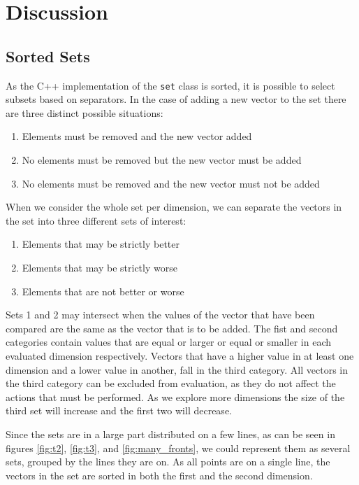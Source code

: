 \documentclass{article}
\begin{document}
	\section{Discussion}
	\label{sec:discussion}
	\subsection{Sorted Sets}
		\label{sub:sorted_sets}
		As the C++ implementation of the \texttt{set} class is sorted, it is
		possible to select subsets based on separators. In the case of adding a
		new vector to the set there are three distinct possible situations:
		\begin{enumerate}
			\item Elements must be removed and the new vector added
			\item No elements must be removed but the new vector must be added
			\item No elements must be removed and the new vector must not be added
		\end{enumerate}
		When we consider the whole set per dimension, we can separate the vectors
		in the set into three different sets of interest:
		\begin{enumerate}
			\item Elements that may be strictly better
			\item Elements that may be strictly worse
			\item Elements that are not better or worse
		\end{enumerate}
		Sets 1 and 2 may intersect when the values of the vector that have been
		compared are the same as the vector that is to be added.  The fist and
		second categories contain values that are equal or larger or equal or
		smaller in each evaluated dimension respectively.  Vectors that have a
		higher value in at least one dimension and a lower value in another, fall
		in the third category.  All vectors in the third category can be excluded
		from evaluation, as they do not affect the actions that must be
		performed.  As we explore more dimensions the size of the third set will
		increase and the first two will decrease.

		Since the sets are in a large part distributed on a few lines, as can be
		seen in figures \ref{fig:t2}, \ref{fig:t3}, and \ref{fig:many_fronts}, we
		could represent them as several sets, grouped by the lines they are on.
		As all points are on a single line, the vectors in the set are sorted in
		both the first and the second dimension.
\end{document}
